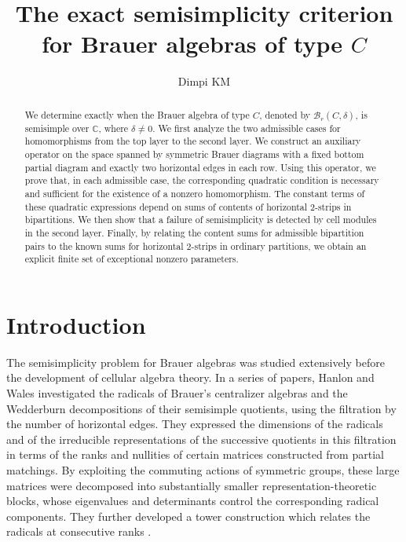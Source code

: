 \documentclass[10pt,a4paper]{amsart}
\newcommand{\C}{\mathbb{C}}
\newcommand{\1}{\mathfrak{1}}
\newcommand{\B}{\mathcal{B}}
\begin{document}
\title[The exact semisimplicity criterion]{The exact semisimplicity criterion for Brauer algebras of type $C$}
\author{Dimpi KM}\address{Indian Institute of Science Education and Research Thiruvananthapuram, Email: dtyagi20@iisertvm.ac.in}

\begin{abstract}
We determine exactly when the Brauer algebra of type $C$, denoted by $\B_r(C,\delta)$, is semisimple over $\C$, where $\delta\neq0$. We first analyze the two admissible cases for homomorphisms from the top layer to the second layer. We construct an auxiliary operator on the space spanned by symmetric Brauer diagrams with a fixed bottom partial diagram and exactly two horizontal edges in each row. Using this operator, we prove that, in each admissible
case, the corresponding quadratic condition is necessary and sufficient for the existence of a nonzero homomorphism. The constant terms of these quadratic expressions depend on sums of contents of horizontal $2$-strips in bipartitions. We then show that a failure of semisimplicity is detected
by cell modules in the second layer. Finally, by relating the content sums for admissible bipartition pairs to the known sums for horizontal $2$-strips in ordinary partitions, we obtain an explicit finite set of exceptional nonzero parameters.
\end{abstract}

\maketitle


\section{Introduction}

The semisimplicity problem for Brauer algebras was studied extensively before the development of cellular algebra theory. In a series of papers, Hanlon and Wales investigated the radicals of Brauer's centralizer algebras and the Wedderburn decompositions
of their semisimple quotients, using the filtration by the number of horizontal edges. They expressed the dimensions of the radicals and of the irreducible representations of the successive quotients in this filtration in terms of the ranks and nullities
of certain matrices constructed from partial matchings. By exploiting the commuting actions of symmetric groups, these large matrices were decomposed into substantially smaller representation-theoretic blocks, whose eigenvalues and determinants control the corresponding radical components. They further developed a tower construction which relates the radicals at consecutive ranks \cite{HW89a,HW89b,HW90,HW94}.
\end{document}

